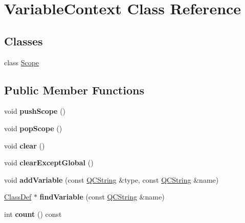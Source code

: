 \hypertarget{class_variable_context}{}\section{Variable\+Context Class Reference}
\label{class_variable_context}
\subsection*{Classes}
\begin{DoxyCompactItemize}
\item 
class \mbox{\hyperlink{class_variable_context_1_1_scope}{Scope}}
\end{DoxyCompactItemize}
\subsection*{Public Member Functions}
\begin{DoxyCompactItemize}
\item 
\mbox{\label{class_variable_context_ae1d858d3ad4778e79ac69a021474edab}} 
void {\bfseries push\+Scope} ()
\item 
\mbox{\label{class_variable_context_a648ebfb9146a61b70dffe684aec77940}} 
void {\bfseries pop\+Scope} ()
\item 
\mbox{\label{class_variable_context_a37579e37d7d730884861f71a1b9f0439}} 
void {\bfseries clear} ()
\item 
\mbox{\label{class_variable_context_af762830da74924aa08900310e554e253}} 
void {\bfseries clear\+Except\+Global} ()
\item 
\mbox{\label{class_variable_context_a290a97ba9049c9c00c2a9fcef5f12083}} 
void {\bfseries add\+Variable} (const \mbox{\hyperlink{class_q_c_string}{Q\+C\+String}} \&type, const \mbox{\hyperlink{class_q_c_string}{Q\+C\+String}} \&name)
\item 
\mbox{\label{class_variable_context_ac6643c9a7fbfa30d341efe5c62c862fb}} 
\mbox{\hyperlink{class_class_def}{Class\+Def}} $\ast$ {\bfseries find\+Variable} (const \mbox{\hyperlink{class_q_c_string}{Q\+C\+String}} \&name)
\item 
\mbox{\label{class_variable_context_a7b35e3003661658788c75b9b0281f23f}} 
int {\bfseries count} () const
\end{DoxyCompactItemize}
